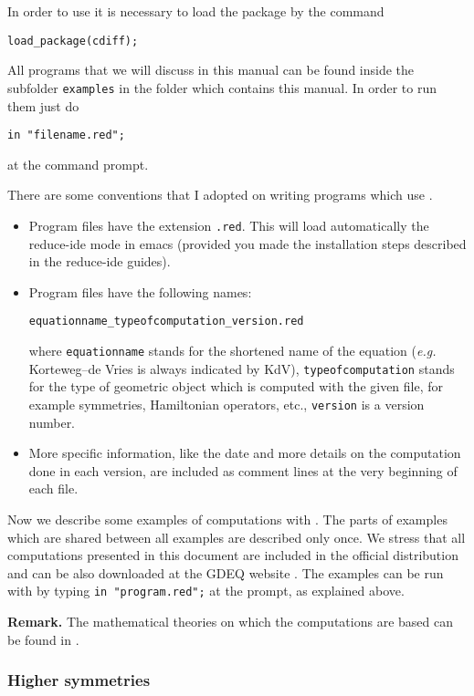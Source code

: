 In order to use \cdiff it is necessary to load the package by the command
\begin{verbatim}
load_package(cdiff);
\end{verbatim}

All programs that we will discuss in this manual can be found inside the
subfolder \texttt{examples} in the folder which contains this manual. In order
to run them just do
\begin{verbatim}
in "filename.red";
\end{verbatim}
at the \REDUCE command prompt.

There are some conventions that I adopted on writing programs which use \cdiff.
\begin{itemize}
\item Program files have the extension \texttt{.red}. This will load
  automatically the reduce-ide mode in emacs (provided you made the
  installation steps described in the reduce-ide guides).
\item Program files have the following names:
  \begin{center}
    \texttt{equationname\_typeofcomputation\_version.red}
  \end{center}
  where \texttt{equationname} stands for the shortened name of the equation
  (\emph{e.g.} Korteweg--de Vries is always indicated by KdV),
  \texttt{typeofcomputation} stands for the type of geometric object which is
  computed with the given file, for example symmetries, Hamiltonian operators,
  etc., \texttt{version} is a version number.
\item More specific information, like the date and more details on the
  computation done in each version, are included as comment lines at the very
  beginning of each file.
\end{itemize}

Now we describe some examples of computations with \cdiff. The parts of
examples which are shared between all examples are described only once. We
stress that all computations presented in this document are included in the
official \REDUCE distribution and can be also downloaded at the GDEQ website
\cite{gdeq}. The examples can be run with \REDUCE by typing \texttt{in
  "program.red";} at the \REDUCE prompt, as explained above.

\textbf{Remark.} The mathematical theories on which the computations are based
can be found in \cite{Many,KKV}.

\subsubsection{Higher symmetries}\label{sec:higher-symmetries}

